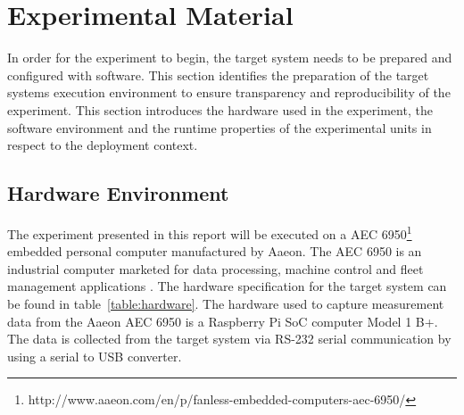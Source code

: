 


\section{Experimental Material}
\label{section:exp-material}
In order for the experiment to begin, the target system needs to be prepared and configured with software. This section identifies the preparation of the target systems execution environment to ensure transparency and reproducibility of the experiment. This section introduces the hardware used in the experiment, the software environment and the runtime properties of the experimental units in respect to the deployment context. 

\subsection{Hardware Environment}
The experiment presented in this report will be executed on a AEC 6950\footnote{http://www.aaeon.com/en/p/fanless-embedded-computers-aec-6950/} embedded personal computer manufactured by Aaeon. The AEC 6950 is an industrial computer marketed for data processing, machine control and fleet management applications \cite{aaeon}. The hardware specification for the target system can be found in table~\ref{table:hardware}. The hardware used to capture measurement data from the Aaeon AEC 6950 is a Raspberry Pi SoC \cite{raspberry} computer Model 1 B+. The data is collected from the target system via RS-232 serial communication by using a serial to USB converter.  

